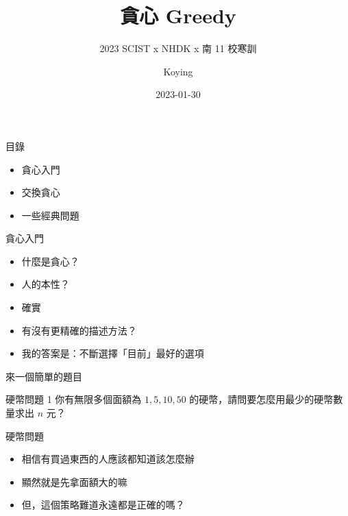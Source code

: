 \documentclass[aspectratio=169]{beamer}
\title{貪心 Greedy}
\subtitle{2023 SCIST x NHDK x 南 11 校寒訓}
\author{Koying}
\date{2023-01-30}
\begin{document}
    \begin{frame}
        \titlepage
    \end{frame}

    \begin{frame}{目錄}
        \begin{itemize}
            \item 貪心入門
            \item 交換貪心
            \item 一些經典問題
        \end{itemize}
    \end{frame}

    \begin{frame}{貪心入門}
        \begin{itemize}
            \item<1-> 什麼是貪心？
            \item<2-> 人的本性？
            \item<3-> 確實
            \item<4-> 有沒有更精確的描述方法？
            \item<5-> 我的答案是：不斷選擇「目前」最好的選項
        \end{itemize}
    \end{frame}

    \begin{frame}{來一個簡單的題目}
        \begin{block}{硬幣問題 1}
            你有無限多個面額為 $1, 5, 10, 50$ 的硬幣，請問要怎麼用最少的硬幣數量求出 $n$ 元？
        \end{block}
    \end{frame}

    \begin{frame}{硬幣問題}
        \begin{itemize}
            \item<1-> 相信有買過東西的人應該都知道該怎麼辦
            \item<1-> 顯然就是先拿面額大的嘛
            \item<2-> 但，這個策略難道永遠都是正確的嗎？
        \end{itemize}
    \end{frame}
\end{document}
